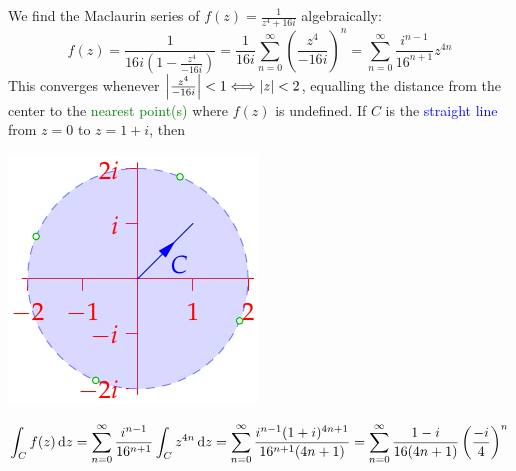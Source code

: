 \begin{examples}{}{}
\begin{enumerate}
	  \begin{minipage}[t]{0.7\linewidth}\vspace{0pt}
		  \item We find the Maclaurin series of $f(z)=\frac 1{z^4+16i}$ algebraically:
		  \[
		  	f(z)=\frac 1{16i\left(1-\frac{z^4}{-16i}\right)} 
		  	=\frac 1{16i}\sum_{n=0}^\infty\left(\frac{z^4}{-16i}\right)^n 
		  	=\sum_{n=0}^\infty\frac{i^{n-1}}{16^{n+1}}z^{4n}
		  \]
		  This converges whenever $\left| \frac{z^4}{-16i}\right|<1\Longleftrightarrow \left| z\right|<2$, equalling the distance from the center to the \textcolor{Green}{nearest point(s)} where $f(z)$ is undefined. If $C$ is the \textcolor{blue}{straight line} from $z=0$ to $z=1+i$, then
	  \end{minipage}
	  \hfill
	  \begin{minipage}[t]{0.29\linewidth}\vspace{0pt}
	  	\flushright\includegraphics[scale=.95]{taylorex3}
	  \end{minipage}\par  
	  \[
	  	\int_Cf(z)\,{\mathrm{d} z}
	  	=\sum_{n=0}^\infty\frac{i^{n-1}}{16^{n+1}}\int_Cz^{4n}\,{\mathrm{d} z} 
	  	=\sum_{n=0}^\infty\frac{i^{n-1}(1+i)^{4n+1}}{16^{n+1}(4n+1)} 
	  	=\sum_{n=0}^\infty\frac{1-i}{16(4n+1)}\left(\frac{-i}{4}\right)^n
	  \] 
	\end{enumerate}
\end{examples}


\goodbreak


